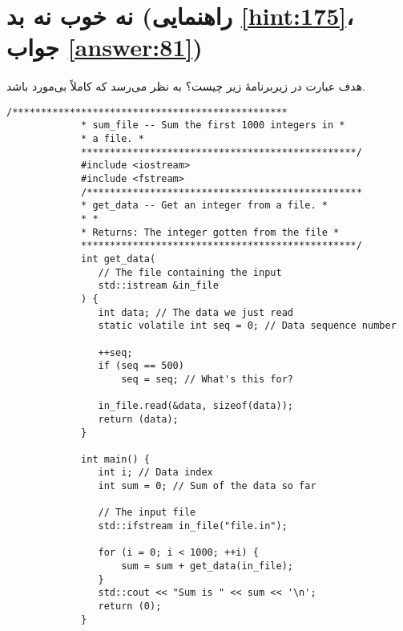\section[نه خوب نه بد]{نه خوب نه بد \protect{} (راهنمایی \ref{hint:175}، جواب \ref{answer:81})}
\paragraph{}\label{prog:104}
هدف عبارت  در زیربرنامهٔ زیر چیست؟ به نظر می‌رسد که کاملاً بی‌مورد باشد.

\begin{LTR}
        \begin{lstlisting}[style=C++Style]
             /************************************************
             * sum_file -- Sum the first 1000 integers in *
             * a file. *
             ************************************************/
             #include <iostream>
             #include <fstream>
             /************************************************
             * get_data -- Get an integer from a file. *
             * *
             * Returns: The integer gotten from the file *
             ************************************************/
             int get_data(
             	// The file containing the input
             	std::istream &in_file
             ) {
             	int data; // The data we just read
             	static volatile int seq = 0; // Data sequence number

             	++seq;
             	if (seq == 500)
             		seq = seq; // What's this for?

             	in_file.read(&data, sizeof(data));
             	return (data);
             }

             int main() {
             	int i; // Data index
             	int sum = 0; // Sum of the data so far

             	// The input file
             	std::ifstream in_file("file.in");

             	for (i = 0; i < 1000; ++i) {
             		sum = sum + get_data(in_file);
             	}
             	std::cout << "Sum is " << sum << '\n';
             	return (0);
             }
        \end{lstlisting}
\end{LTR}
